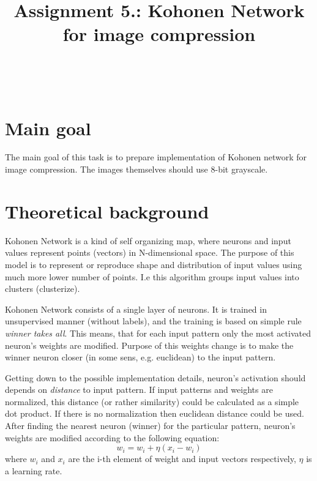 \documentclass{classrep}
\author{%
    \ifthenelse{\boolean{is_karwowski}}
    {\studentinfo[239671@edu.p.lodz.pl]{Jan Karwowski}{239671}\\}
    {\studentinfo[239676@edu.p.lodz.pl]{Kamil Kowalewski}{239676}\\}
}
\title{Assignment 5.: Kohonen Network for image compression}
\begin{document}
    \maketitle
    \thispagestyle{fancyplain}

    \tableofcontents
    \newpage

    \section{Main goal} \label{main_goal} {
        The main goal of this task is to prepare implementation of Kohonen network for
        image compression. The images themselves should use 8-bit grayscale.
    }

    \section{Theoretical background} \label{theory} {
        Kohonen Network is a kind of self organizing map, where neurons and input values represent
        points (vectors) in N-dimensional space. The purpose of this model is to represent or
        reproduce shape and distribution of input values using much more lower number of points. I.e
        this algorithm groups input values into clusters (clusterize).

        Kohonen Network consists of a single layer of neurons. It is trained in unsupervised manner
        (without labels), and the training is based on simple rule \emph{winner takes all}.  This
        means, that for each input pattern only the most activated neuron's weights are modified.
        Purpose of this weights change is to make the winner neuron closer (in some sens, e.g.
        euclidean) to the input pattern.

        Getting down to the possible implementation details, neuron's activation should depends on
        \emph{distance} to input pattern. If input patterns and weights are normalized, this
        distance (or rather similarity) could be calculated as a simple dot product. If there is no
        normalization then euclidean distance could be used. After finding the nearest neuron
        (winner) for the particular pattern, neuron's weights are modified according to the
        following equation:
        \begin{equation}
            w_{i} = w_{i} + \eta (x_{i} - w_{i})
        \end{equation}
        where $w_{i}$ and $x_{i}$ are the i-th element of weight and input vectors respectively,
        $\eta$ is a learning rate.

}
\end{document}
